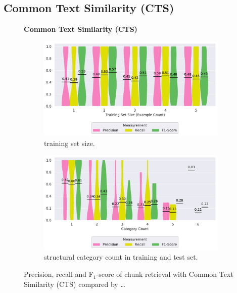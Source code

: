 \subsection{Common Text Similarity (CTS)}
\label{sec:r:cts}
\begin{figure}
\centering
    \textbf{Common Text Similarity (CTS)}\par\medskip
\begin{subfigure}[t]{\columnwidth}
		\centering
		\includegraphics[width=\columnwidth,
		clip]{img/big-study/recall-precision-examplecount-CTS.pdf}
		\caption{training set size.}
		\label{fig:recall-precision-examplecount-CTS}

\end{subfigure}\hspace{\fill}
\begin{subfigure}[t]{\columnwidth}
		\centering
				\includegraphics[width=\columnwidth,
				clip]{img/big-study/recall-precision-categorycount-CTS.pdf}
		\caption{structural category count
		in training and test set.}
		\label{fig:recall-precision-categorycount-CTS}
\end{subfigure}
\caption{Precision, recall and F$_{1}$-score of chunk
retrieval with Common Text Similarity (CTS) compared by \ldots}
\end{figure}

